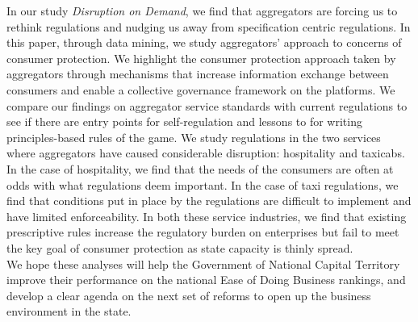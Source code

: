 \documentclass[a4paper, 12pt, twoside]{article}
\begin{document}
In our study \textit{Disruption on Demand}, we find that aggregators are forcing us to rethink regulations and nudging us away from specification centric regulations. In this paper, through data mining, we study aggregators’ approach to concerns of consumer protection. We highlight the consumer protection approach taken by aggregators through mechanisms that increase information exchange between consumers and enable a collective governance framework on the platforms. We compare our findings on aggregator service standards with current regulations to see if there are entry points for self-regulation and lessons to for writing principles-based rules of the game. We study regulations in the two services where aggregators have caused considerable disruption: hospitality and taxicabs. In the case of hospitality, we find that the needs of the consumers are often at odds with what regulations deem important. In the case of taxi regulations, we find that conditions put in place by the regulations are difficult to implement and have limited enforceability. In both these service industries, we find that existing prescriptive rules increase the regulatory burden on enterprises but fail to meet the key goal of consumer protection as state capacity is thinly spread. \\

We hope these analyses will help the Government of National Capital Territory improve their performance on the national Ease of Doing Business rankings, and develop a clear agenda on the next set of reforms to open up the business environment in the state.\\ 








                  
                                                 
\end{document}
